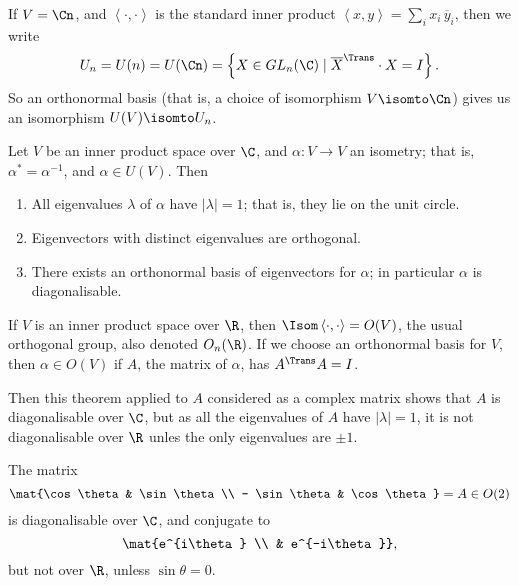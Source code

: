 If $V=\Cn$, and $\left\langle \cdot,\cdot \right\rangle$ is the standard inner product $\left\langle x,y \right\rangle = \sum_i x_i\,\overline{y}_i$, then we write
\begin{equation*}
	U_n = U(n) = U(\Cn)
	= \left\{X\in GL_n(\C) \mid \overline{X}^\Trans \cdot X = I \right\}.
\end{equation*}
So an orthonormal basis (that is, a choice of isomorphism $V\isomto \Cn$) gives us an isomorphism $U(V) \isomto U_n$.

\begin{theorem}
	Let $V$ be an inner product space over $\C$, and $\alpha:V\to V$ an isometry; that is, $\alpha^*=\alpha^{-1}$, and $\alpha\in U(V)$. Then \label{thm:eive-isometry} %
	\begin{enumerate}
		\shortskip
		\item All eigenvalues $\lambda$ of $\alpha$ have $\left\vert \lambda \right\vert=1$; that is, they lie on the unit circle. %
		\item Eigenvectors with distinct eigenvalues are orthogonal.
		\item There exists an orthonormal basis of eigenvectors for $\alpha$; in particular $\alpha$ is diagonalisable. %
	\end{enumerate}
\end{theorem}

\vspace{3pt}
\begin{remark}
	If $V$ is an inner product space over $\R$, then $\Isom\left\langle \cdot,\cdot \right\rangle=O(V)$, the usual orthogonal group,  also denoted $O_n(\R)$.  If we choose an orthonormal basis for $V$, then $\alpha\in O(V)$ if $A$, the matrix of $\alpha$, has $A^\Trans A=I$. %
	
	Then this theorem applied to $A$ considered as a complex matrix shows that $A$ is diagonalisable over $\C$, but as all the eigenvalues of $A$ have $\left\vert \lambda \right\vert=1$, it is not diagonalisable over $\R$ unles the only eigenvalues are $\pm 1$. %
\end{remark}

\begin{example}
	The matrix
	\begin{equation*}
		\mat{\cos\theta & \sin\theta \\ - \sin\theta & \cos\theta} = A\in O(2) %
	\end{equation*}
	is diagonalisable over $\C$, and conjugate to
	\begin{equation*}
		\mat{e^{i\theta} \\ & e^{-i\theta}},
	\end{equation*}
	but not over $\R$, unless $\sin\theta=0$. %
\end{example}

